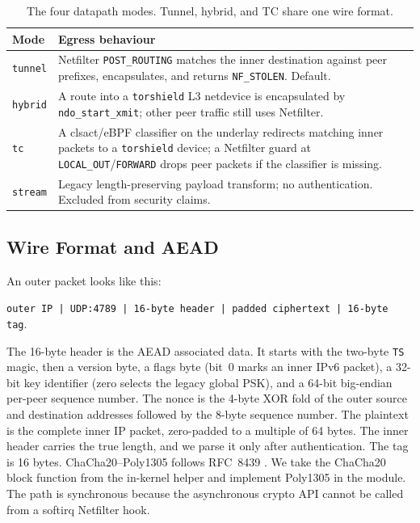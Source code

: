\documentclass[conference]{IEEEtran}
\newcommand{\code}[1]{\texttt{#1}}
\begin{document}
\begin{table}[t]
\centering
\caption{The four datapath modes. Tunnel, hybrid, and TC share one wire format.}
\label{tab:modes}
\footnotesize
\setlength{\tabcolsep}{3pt}
\begin{tabular}{@{}p{}p{}@{}}
\toprule
Mode & Egress behaviour \\
\midrule
\code{tunnel} & Netfilter \code{POST\_ROUTING} matches the inner destination against peer prefixes, encapsulates, and returns \code{NF\_STOLEN}. Default. \\
\code{hybrid} & A route into a \code{torshield} L3 netdevice is encapsulated by \code{ndo\_start\_xmit}; other peer traffic still uses Netfilter. \\
\code{tc} & A clsact/eBPF classifier on the underlay redirects matching inner packets to a \code{torshield} device; a Netfilter guard at \code{LOCAL\_OUT}/\code{FORWARD} drops peer packets if the classifier is missing. \\
\code{stream} & Legacy length-preserving payload transform; no authentication. Excluded from security claims. \\
\bottomrule
\end{tabular}
\end{table}

\subsection{Wire Format and AEAD}
An outer packet looks like this:
\begin{center}
\footnotesize
\code{outer IP | UDP:4789 | 16-byte header | padded ciphertext | 16-byte tag}.
\end{center}
The 16-byte header is the AEAD associated data. It starts with the two-byte \code{TS} magic, then a version byte, a flags byte (bit~0 marks an inner IPv6 packet), a 32-bit key identifier (zero selects the legacy global PSK), and a 64-bit big-endian per-peer sequence number. The nonce is the 4-byte XOR fold of the outer source and destination addresses followed by the 8-byte sequence number. The plaintext is the complete inner IP packet, zero-padded to a multiple of 64 bytes. The inner header carries the true length, and we parse it only after authentication. The tag is 16 bytes. ChaCha20--Poly1305 follows RFC~8439 \cite{nir2018rfc8439}. We take the ChaCha20 block function from the in-kernel helper and implement Poly1305 in the module. The path is synchronous because the asynchronous crypto API cannot be called from a softirq Netfilter hook.
\end{document}
